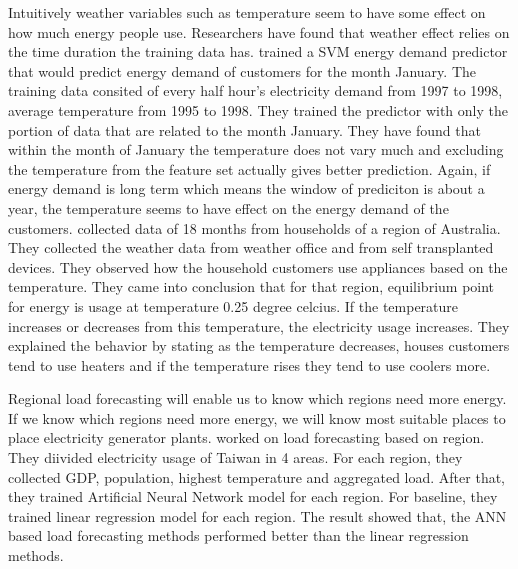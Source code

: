 Intuitively weather variables such as temperature seem to have some effect on how much energy people use. Researchers have found that weather effect relies on the time duration the training data has. \cite{chen2004load} trained a SVM energy demand predictor that would predict energy demand of customers for the month January. The training data consited of every half hour's electricity demand from 1997 to 1998, average temperature from 1995 to 1998. They trained the predictor with only the portion of data that are related to the month January. They have found that within the month of January the temperature does not vary much and excluding the temperature from the feature set actually gives better prediction. Again, if energy demand is long term which means the window of prediciton is about a year, the temperature seems to have effect on the energy demand of the customers. \cite{hart2004weather} collected data of 18 months from households of a region of Australia. They collected the weather data from weather office and from self transplanted devices. They observed how the household customers use appliances based on the temperature. They came into conclusion that for that region, equilibrium point for energy is usage at temperature 0.25 degree celcius. If the temperature increases or decreases from this temperature, the electricity usage increases. They explained the behavior by stating as the temperature decreases, houses customers tend to use heaters and if the temperature rises they tend to use coolers more.

Regional load forecasting will enable us to know which regions need more energy. If we know which regions need more energy, we will know most suitable places to place electricity generator plants. \cite{hsu2003regional} worked on load forecasting based on region. They diivided electricity usage of Taiwan in 4 areas. For each region, they collected GDP,  population, highest temperature and aggregated load. After that, they trained Artificial Neural Network model for each region. For baseline, they trained linear regression model for each region. The result showed that, the ANN based load forecasting methods performed better than the linear regression  methods. 

